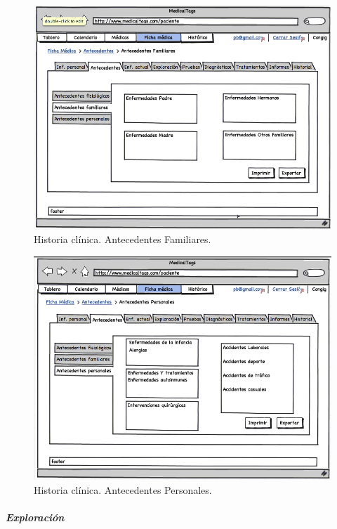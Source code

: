 			\begin{figure}[H]
			  \centering
			    \includegraphics[width=12cm]{img/png/interfaz/31_Antecedentes_pacientes1.png}
			  \caption{Historia clínica. Antecedentes Familiares.}
			  \label{fig:iu_antecedentes_familiares}
			\end{figure}
			
			\begin{figure}[H]
			  \centering
			    \includegraphics[width=12cm]{img/png/interfaz/32_Antecedentes_pacientes2.png}
			  \caption{Historia clínica. Antecedentes Personales.}
			  \label{fig:iu_antecedentes_personales}
			\end{figure}
			
		
		\subparagraph{Exploración} %
		\label{par:inter_exploracion}
		
